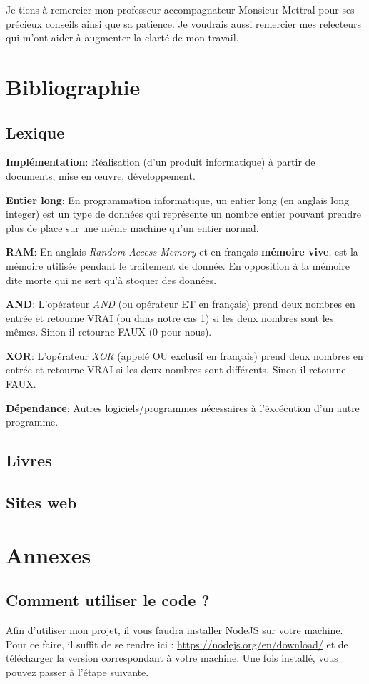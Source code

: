 \documentclass[a4paper]{article}
\newcommand{\lexique}[2]{\item{\textbf{#1}:} #2}
\begin{document}
    Je tiens à remercier mon professeur accompagnateur Monsieur Mettral pour ses précieux conseils ainsi que sa patience. Je voudrais aussi remercier mes relecteurs qui m'ont aider à augmenter la clarté de mon travail.
\newpage
\section{Bibliographie}

\subsection{Lexique}
    \begin{description}
        \lexique{Implémentation}{Réalisation (d’un produit informatique) à partir de documents, mise en œuvre, développement.}
        \lexique{Entier long}{En programmation informatique, un entier long (en anglais long integer) est un type de données qui représente un nombre entier pouvant prendre plus de place sur une même machine qu'un entier normal.}
        \lexique{RAM}{En anglais \textit{Random Access Memory} et en français \textbf{mémoire vive}, est la mémoire utilisée pendant le traitement de donnée. En opposition à la mémoire dite morte qui ne sert qu'à stoquer des données.}
        \lexique{AND}{L'opérateur \textit{AND} (ou opérateur ET en français) prend deux nombres en entrée et retourne VRAI (ou dans notre cas 1) si les deux nombres sont les mêmes. Sinon il retourne FAUX (0 pour nous).}
        \lexique{XOR}{L'opérateur \textit{XOR} (appelé OU exclusif en français) prend deux nombres en entrée et retourne VRAI si les deux nombres sont différents. Sinon il retourne FAUX.}
	    \lexique{Dépendance}{Autres logiciels/programmes nécessaires à l'éxcécution d'un autre programme.}
    \end{description}
\subsection{Livres}
\printbibliography[heading=none, type=book]
\subsection{Sites web}
\printbibliography[heading=none, type=misc]

\section{Annexes}
\subsection{Comment utiliser le code ?}
    Afin d'utiliser mon projet, il vous faudra installer NodeJS sur votre machine. Pour ce faire, il suffit de se rendre ici : \url{https://nodejs.org/en/download/} et de télécharger la version correspondant à votre machine. Une fois installé, vous pouvez passer à l'étape suivante.
    
\end{document}

